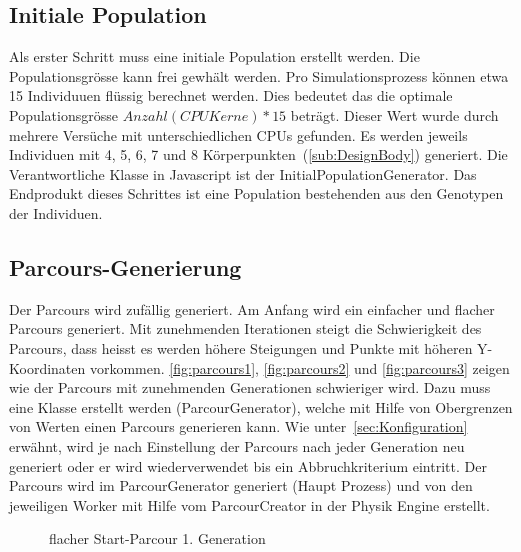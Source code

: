     \subsection{Initiale Population\label{sec:Initiale Polulation}}

      Als erster Schritt muss eine initiale Population erstellt werden. Die Populationsgrösse kann frei gewhält werden.
      Pro Simulationsprozess können etwa 15 Individuuen flüssig berechnet werden.
      Dies bedeutet das die optimale Populationsgrösse  \( Anzahl(CPU Kerne) * 15 \) beträgt.
      Dieser Wert wurde durch mehrere Versüche mit unterschiedlichen CPUs gefunden.
      Es werden jeweils Individuen mit 4, 5, 6, 7 und 8 Körperpunkten~(\vref{sub:DesignBody}) generiert.
      Die Verantwortliche Klasse in Javascript ist der InitialPopulationGenerator.
      Das Endprodukt dieses Schrittes ist eine Population bestehenden aus den Genotypen der Individuen.

    \subsection{Parcours-Generierung\label{sec:Parcour Generierung}}

      Der Parcours wird zufällig generiert. Am Anfang wird ein einfacher und flacher Parcours generiert.
      Mit zunehmenden Iterationen steigt die Schwierigkeit des Parcours,
      dass heisst es werden höhere Steigungen und Punkte mit höheren Y-Koordinaten vorkommen.
      \vref{fig:parcours1}, \vref{fig:parcours2} und \vref{fig:parcours3} zeigen wie der Parcours mit zunehmenden Generationen schwieriger wird.
      Dazu muss eine Klasse erstellt werden (ParcourGenerator),
      welche mit Hilfe von Obergrenzen von Werten einen Parcours generieren kann.
      Wie unter~\ref{sec:Konfiguration} erwähnt,
      wird je nach Einstellung der Parcours nach jeder Generation neu generiert oder er wird wiederverwendet
      bis ein Abbruchkriterium eintritt.
      Der Parcours wird im ParcourGenerator generiert (Haupt Prozess) und
      von den jeweiligen Worker mit Hilfe vom ParcourCreator in der Physik Engine erstellt.

      \vspace{1cm}

      \begin{figure}[H]
        \centering
        
        \caption{flacher Start-Parcour 1. Generation\label{fig:parcours1}}
      \end{figure}

